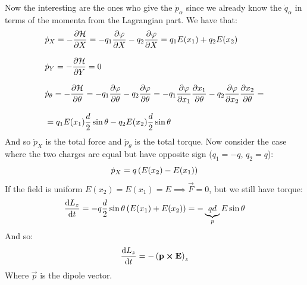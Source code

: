 Now the interesting \hamiltonref\;are the ones who give the $\dot{p}_{\alpha}$ since we already know the $\dot{q}_{\alpha}$ in terms of the momenta from the Lagrangian part. We have that:
\begin{equation}
  \begin{split}
    &\dot{p}_X = -\pdv{\hamfun}{X} = - q_1 \pdv{\potE}{X} - q_2 \pdv{\potE}{X} = q_1E(x_1) + q_2E(x_2) \\[8pt]
    &\dot{p}_Y = -\pdv{\hamfun}{Y} = 0 \\[8pt]
    &\dot{p}_\theta = -\pdv{\hamfun}{\theta} = - q_1 \pdv{\potE}{\theta} - q_2 \pdv{\potE}{\theta} = - q_1 \pdv{\potE}{x_1}\pdv{x_1}{\theta} - q_2 \pdv{\potE}{x_2}\pdv{x_2}{\theta} = \\[8pt]
    &= q_1E(x_1)\dfrac{d}{2}\sin \theta - q_2E(x_2)\dfrac{d}{2}\sin \theta
  \end{split}
\end{equation}
And so $\dot{p}_X$ is the total force and $\dot{p}_{\theta}$ is the total torque. Now consider the case where the two charges are equal but have opposite sign ($q_1 = -q$, $q_2 = q$):
\begin{equation}
  \dot{p}_X = q \left(E(x_2) - E(x_1)\right)\\[8pt]
\end{equation}
If the field is uniform $E(x_2) = E(x_1) = E \implies \vec{F} = 0$, but we still have torque:
\begin{equation}
  \dv{L_z}{t} = -q\dfrac{d}{2}\sin \theta \brackets{E(x_1) + E(x_2)} = -\underbrace{qd}_p E\sin \theta
\end{equation}
And so:
\begin{equation}
  \dv{L_z}{t} = -\brackets{\vec{p} \cross \vec{E}}_z
\end{equation}
Where $\vec{p}$ is the dipole vector.
